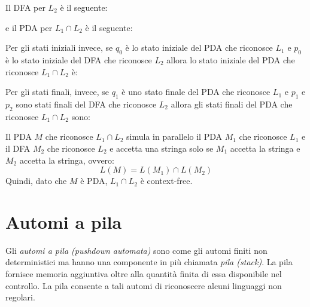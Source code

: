 \documentclass[12pt]{report}
\begin{document}
Il DFA per $L_2$ è il seguente:
\begin{center}
\end{center}
e il PDA per $L_1 \cap L_2$ è  il seguente:
\begin{center}
\end{center}
Per gli stati iniziali invece, se $q_0$ è lo stato iniziale del PDA che riconosce $L_1$ e $p_0$ è lo stato iniziale del DFA che riconosce $L_2$ allora lo stato iniziale del PDA che riconosce $L_1 \cap L_2$ è:
\begin{center}
\end{center}
Per gli stati finali, invece, se $q_1$ è uno stato finale del PDA che riconosce $L_1$ e $p_1$ e $p_2$ sono stati finali del DFA che riconosce $L_2$ allora gli stati finali del PDA che riconosce $L_1 \cap L_2$ sono:
\begin{center}
\end{center}
Il PDA $M$ che riconosce $L_1 \cap L_2$ simula in parallelo il PDA $M_1$ che riconosce $L_1$ e  il DFA $M_2$ che riconosce $L_2$ e accetta una stringa solo se $M_1$ accetta la stringa e $M_2$ accetta la stringa, ovvero:
\[
L(M) = L(M_1) \cap L(M_2)
\]
Quindi, dato che $M$ è PDA, $L_1 \cap L_2$ è context-free.
\section{Automi a pila}
Gli \textit{automi a pila (pushdown automata)} sono come gli automi finiti non deterministici ma hanno una componente in più chiamata \textit{pila (stack)}. La pila fornisce memoria aggiuntiva oltre alla quantità finita di essa disponibile nel controllo. La pila consente a tali automi di riconoscere alcuni linguaggi non regolari.
\end{document}
